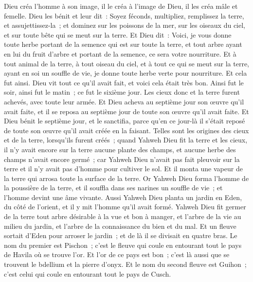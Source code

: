 \begin{multicols}{2}
Dieu créa l'homme à son image, il le créa à l'image de Dieu, il les créa mâle et femelle.
Dieu les bénit et leur dit~: Soyez féconds, multipliez, remplissez la terre, et assujettissez-la~; et dominez sur les poissons de la mer, sur les oiseaux du ciel, et sur toute bête qui se meut sur la terre.
Et Dieu dit~: Voici, je vous donne toute herbe portant de la semence qui est sur toute la terre, et tout arbre ayant en lui du fruit d'arbre et portant de la semence, ce sera votre nourriture.
Et à tout animal de la terre, à tout oiseau du ciel, et à tout ce qui se meut sur la terre, ayant en soi un souffle de vie, je donne toute herbe verte pour nourriture. Et cela fut ainsi.
Dieu vit tout ce qu'il avait fait, et voici cela était très bon. Ainsi fut le soir, ainsi fut le matin~; ce fut le sixième jour.
\VerseOne{}Les cieux donc et la terre furent achevés, avec toute leur armée.
Et Dieu acheva au septième jour son œuvre qu'il avait faite, et il se reposa au septième jour de toute son œuvre qu'il avait faite.
Et Dieu bénit le septième jour, et le sanctifia, parce qu'en ce jour-là il s'était reposé de toute son œuvre qu'il avait créée en la faisant.
Telles sont les origines des cieux et de la terre, lorsqu'ils furent créés~;
quand Yahweh Dieu fit la terre et les cieux, il n'y avait encore sur la terre aucune plante des champs, et aucune herbe des champs n'avait encore germé~; car Yahweh Dieu n'avait pas fait pleuvoir sur la terre et il n'y avait pas d'homme pour cultiver le sol.
Et il monta une vapeur de la terre qui arrosa toute la surface de la terre.
Or Yahweh Dieu forma l'homme de la poussière de la terre, et il souffla dans ses narines un souffle de vie~; et l'homme devint une âme vivante.
Aussi Yahweh Dieu planta un jardin en Eden, du côté de l'orient, et il y mit l'homme qu'il avait formé.
Yahweh Dieu fit germer de la terre tout arbre désirable à la vue et bon à manger, et l'arbre de la vie au milieu du jardin, et l'arbre de la connaissance du bien et du mal.
Et un fleuve sortait d'Eden pour arroser le jardin~; et de là il se divisait en quatre bras.
Le nom du premier est Pischon~; c'est le fleuve qui coule en entourant tout le pays de Havila où se trouve l'or.
Et l'or de ce pays est bon~; c'est là aussi que se trouvent le bdellium et la pierre d'onyx.
Et le nom du second fleuve est Guihon~; c'est celui qui coule en entourant tout le pays de Cusch.

\end{multicols}
